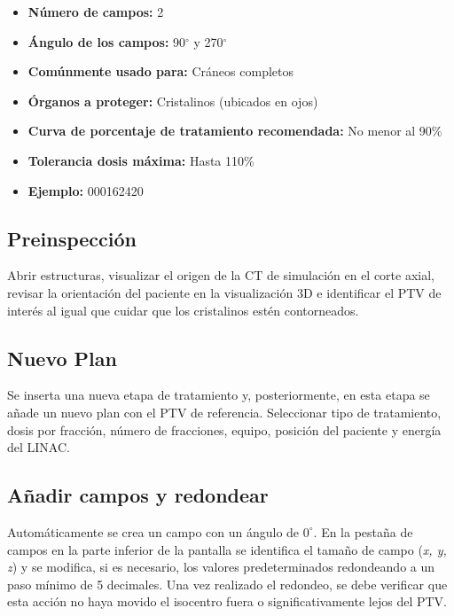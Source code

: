 \documentclass{article}
\begin{document}
\begin{center}
    \begin{tcolorbox}[colback=gray!25!white, colframe=gray, title=\textbf{Resumen}, width=0.8\linewidth, center title]
        \begin{itemize}
            \item \textbf{Número de campos:} 2
            \item \textbf{Ángulo de los campos:} 90$^{\circ}$ y 270$^{\circ}$
            \item \textbf{Comúnmente usado para:} Cráneos completos
            \item \textbf{Órganos a proteger:} Cristalinos (ubicados en ojos)
            \item \textbf{Curva de porcentaje de tratamiento recomendada:} No menor al 90\%
            \item \textbf{Tolerancia dosis máxima:} Hasta 110\%
            \item \textbf{Ejemplo:} 000162420
        \end{itemize}
    \end{tcolorbox}
\end{center}

\subsection{Preinspección}

Abrir estructuras, visualizar el origen de la CT de simulación en el corte axial, revisar la orientación del paciente en la visualización 3D e identificar el PTV de interés al igual que cuidar que los cristalinos estén contorneados.

\subsection{Nuevo Plan}

Se inserta una nueva etapa de tratamiento y, posteriormente, en esta etapa se añade un nuevo plan con el PTV de referencia. Seleccionar tipo de tratamiento, dosis por fracción, número de fracciones, equipo, posición del paciente y energía del LINAC.

\subsection{Añadir campos y redondear}

Automáticamente se crea un campo con un ángulo de $0^{\circ}$. En la pestaña de campos en la parte inferior de la pantalla se identifica el tamaño de campo (\textit{x, y, z}) y se modifica, si es necesario, los valores predeterminados redondeando a un paso mínimo de 5 decimales. Una vez realizado el redondeo, se debe verificar que esta acción no haya movido el isocentro fuera o significativamente lejos del PTV.
\end{document}
